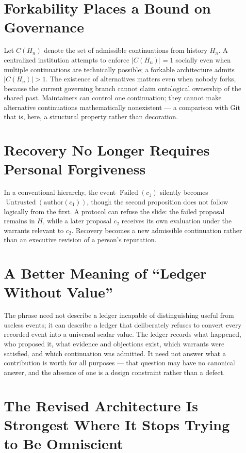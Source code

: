 \documentclass[12pt]{article}
\begin{document}
\section{Forkability Places a Bound on Governance}

Let $C(H_n)$ denote the set of admissible continuations from history $H_n$. A centralized institution attempts to enforce $|C(H_n)|=1$ socially even when multiple continuations are technically possible; a forkable architecture admits $|C(H_n)|>1$. The existence of alternatives matters even when nobody forks, because the current governing branch cannot claim ontological ownership of the shared past. Maintainers can control one continuation; they cannot make alternative continuations mathematically nonexistent — a comparison with Git that is, here, a structural property rather than decoration.

\section{Recovery No Longer Requires Personal Forgiveness}

In a conventional hierarchy, the event $\operatorname{Failed}(c_1)$ silently becomes $\operatorname{Untrusted}(\text{author}(c_1))$, though the second proposition does not follow logically from the first. A protocol can refuse the slide: the failed proposal remains in $H$, while a later proposal $c_2$ receives its own evaluation under the warrants relevant to $c_2$. Recovery becomes a new admissible continuation rather than an executive revision of a person's reputation.

\section{A Better Meaning of ``Ledger Without Value''}

The phrase need not describe a ledger incapable of distinguishing useful from useless events; it can describe a ledger that deliberately refuses to convert every recorded event into a universal scalar value. The ledger records what happened, who proposed it, what evidence and objections exist, which warrants were satisfied, and which continuation was admitted. It need not answer what a contribution is worth for all purposes — that question may have no canonical answer, and the absence of one is a design constraint rather than a defect.

\section{The Revised Architecture Is Strongest Where It Stops Trying to Be Omniscient}
\end{document}
